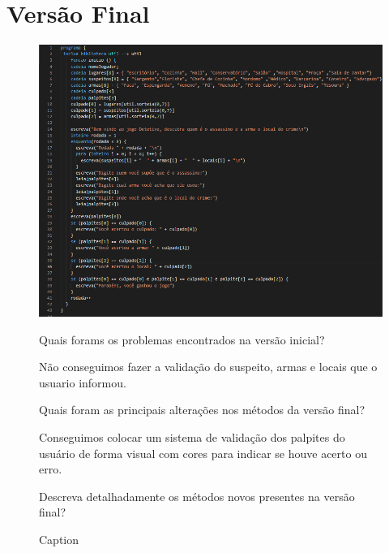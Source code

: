 \section{Versão Final}

\vspace{-65mm}
\begin{figure}[!h]
    \centering
    \caption{Caption}
    \label{fig:enter-label}
    \includegraphics[scale=0.75]{final.png }    


{\large Quais forams os problemas encontrados na versão inicial? }
\newline

\begin{flushleft}
    Não conseguimos fazer a validação do suspeito, armas e locais que o usuario informou.
\end{flushleft}

{\large Quais foram as principais alterações nos métodos da versão final? }
\newline
     \begin{flushleft}
     Conseguimos colocar um sistema de validação dos palpites do usuário de forma visual com cores para indicar se houve acerto ou erro.
\end{flushleft}

{\large Descreva detalhadamente os métodos novos presentes na versão final?}

\end{figure}
\pagebreak

